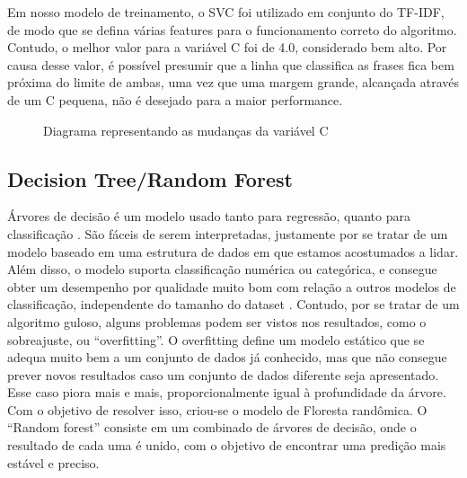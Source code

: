Em nosso modelo de treinamento, o SVC foi utilizado em conjunto do TF-IDF, de modo que se defina várias features para o funcionamento correto do algoritmo. Contudo, o melhor valor para a variável C foi de 4.0, considerado bem alto. Por causa desse valor, é possível presumir que a linha que classifica as frases fica bem próxima do limite de ambas, uma vez que uma margem grande, alcançada através de um C pequena, não é desejado para a maior performance.

\begin{figure}[!htb]
    \caption{\label{fig:my-label} Diagrama representando as mudanças da variável C}
\end{figure}

\subsection{Decision Tree/Random Forest}

Árvores de decisão é um modelo usado tanto para regressão, quanto para classificação \cite{decision-tree}. São fáceis de serem interpretadas, justamente por se tratar de um modelo baseado em uma estrutura de dados em que estamos acostumados a lidar. Além disso, o modelo suporta classificação numérica ou categórica, e consegue obter um desempenho por qualidade muito bom com relação a outros modelos de classificação, independente do tamanho do dataset \cite{performance-comparison}. Contudo, por se tratar de um algoritmo guloso, alguns problemas podem ser vistos nos resultados, como o sobreajuste, ou “overfitting”. O overfitting define um modelo estático que se adequa muito bem a um conjunto de dados já conhecido, mas que não consegue prever novos resultados caso um conjunto de dados diferente seja apresentado. Esse caso piora mais e mais, proporcionalmente igual à profundidade da árvore.  Com o objetivo de resolver isso, criou-se o modelo de Floresta randômica. O “Random forest” consiste em um combinado de árvores de decisão, onde o resultado de cada uma é unido, com o objetivo de encontrar uma predição mais estável e preciso.

